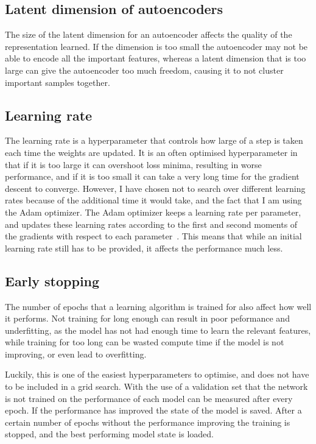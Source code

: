 \documentclass[12pt,a4paper,twoside,openright]{report}
\begin{document}
\subsection{Latent dimension of autoencoders}
The size of the latent dimension for an autoencoder affects the quality of the representation learned. If the dimension is too small the 
autoencoder may not be able to encode all the important features, whereas a latent dimension that is too large can give the autoencoder 
too much freedom, causing it to not cluster important samples together.

\subsection{Learning rate}
The learning rate is a hyperparameter that controls how large of a step is taken each time the weights are updated. It is an often
optimised hyperparameter in that if it is too large it can overshoot loss minima, resulting in worse performance, and if it is too 
small it can take a very long time for the gradient descent to converge. However, I have chosen not to search over different learning 
rates because of the additional time it would take, and the fact that I am using the Adam optimizer. The Adam optimizer keeps a 
learning rate per parameter, and updates these learning rates according to the first and second moments of the gradients with respect to each 
parameter~\cite{DBLP:journals/corr/KingmaB14}. This means that while an initial learning rate still has to be provided, it affects the 
performance much less.

\subsection{Early stopping}
The number of epochs that a learning algorithm is trained for also affect how well it performs. Not training for long enough can result in
poor peformance and underfitting, as the model has not had enough time to learn the relevant features, while training for too long can
be wasted compute time if the model is not improving, or even lead to overfitting.

Luckily, this is one of the easiest hyperparameters to optimise, and does not have to be included in a grid search. 
With the use of a validation set that the network is not trained on the performance of each model can be measured after every epoch. 
If the performance has improved the state of the model is saved. After a certain number of epochs without the performance improving 
the training is stopped, and the best performing model state is loaded.
\end{document}
